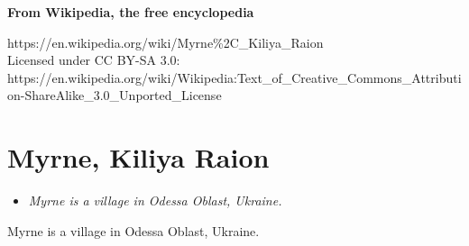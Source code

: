 \textbf{From Wikipedia, the free encyclopedia}

https://en.wikipedia.org/wiki/Myrne\%2C\_Kiliya\_Raion\\
Licensed under CC BY-SA 3.0:\\
https://en.wikipedia.org/wiki/Wikipedia:Text\_of\_Creative\_Commons\_Attribution-ShareAlike\_3.0\_Unported\_License

\section{Myrne, Kiliya Raion}\label{myrne-kiliya-raion}

\begin{itemize}
\item
  \emph{Myrne is a village in Odessa Oblast, Ukraine.}
\end{itemize}

Myrne is a village in Odessa Oblast, Ukraine.
